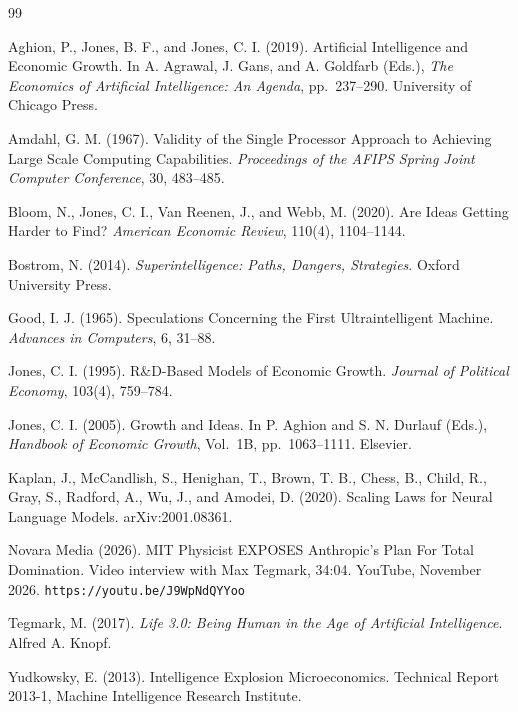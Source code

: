 \documentclass[11pt]{article}
\begin{document}
\begin{thebibliography}{99}

Aghion, P., Jones, B. F., and Jones, C. I. (2019).
Artificial Intelligence and Economic Growth.
In A. Agrawal, J. Gans, and A. Goldfarb (Eds.), \emph{The Economics of Artificial Intelligence: An Agenda}, pp.~237--290. University of Chicago Press.

Amdahl, G. M. (1967).
Validity of the Single Processor Approach to Achieving Large Scale Computing Capabilities.
\emph{Proceedings of the AFIPS Spring Joint Computer Conference}, 30, 483--485.

Bloom, N., Jones, C. I., Van Reenen, J., and Webb, M. (2020).
Are Ideas Getting Harder to Find?
\emph{American Economic Review}, 110(4), 1104--1144.

Bostrom, N. (2014).
\emph{Superintelligence: Paths, Dangers, Strategies}.
Oxford University Press.

Good, I. J. (1965).
Speculations Concerning the First Ultraintelligent Machine.
\emph{Advances in Computers}, 6, 31--88.

Jones, C. I. (1995).
R\&D-Based Models of Economic Growth.
\emph{Journal of Political Economy}, 103(4), 759--784.

Jones, C. I. (2005).
Growth and Ideas.
In P. Aghion and S. N. Durlauf (Eds.), \emph{Handbook of Economic Growth}, Vol.~1B, pp.~1063--1111. Elsevier.

Kaplan, J., McCandlish, S., Henighan, T., Brown, T. B., Chess, B., Child, R., Gray, S., Radford, A., Wu, J., and Amodei, D. (2020).
Scaling Laws for Neural Language Models.
arXiv:2001.08361.

Novara Media (2026).
MIT Physicist EXPOSES Anthropic's Plan For Total Domination.
Video interview with Max Tegmark, 34:04. YouTube, November 2026. \texttt{https://youtu.be/J9WpNdQYYoo}

Tegmark, M. (2017).
\emph{Life 3.0: Being Human in the Age of Artificial Intelligence}.
Alfred A. Knopf.

Yudkowsky, E. (2013).
Intelligence Explosion Microeconomics.
Technical Report 2013-1, Machine Intelligence Research Institute.

\end{thebibliography}
\end{document}
